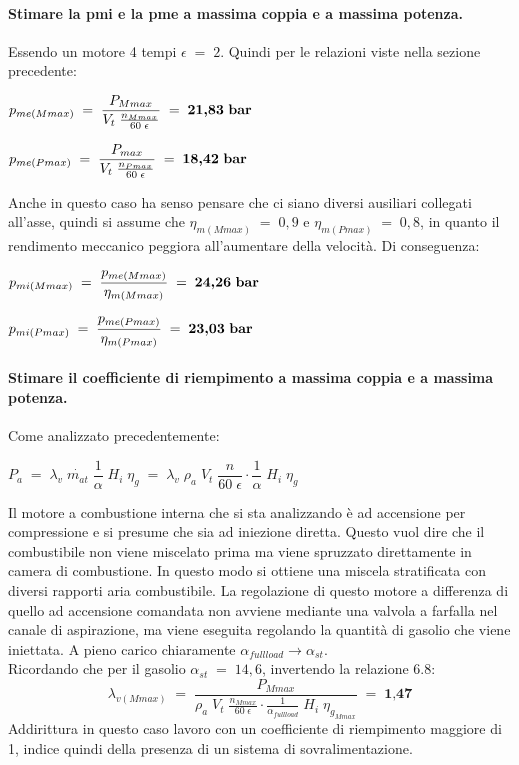 \documentclass[a4paper, twoside, 12pt]{report}
\begin{document}
\paragraph{Stimare la pmi e la pme a massima coppia e a massima potenza.\\}
Essendo un motore 4 tempi $\epsilon\;=\;2$. Quindi per le relazioni viste nella sezione precedente:
\begin{center}
	$p_{me(Mmax)}\;=\;\dfrac{P_{Mmax}}{V_{t}\;\frac{n_{Mmax}}{60\;\epsilon}}\;=\;\textbf{21,83\;bar}$
\end{center}
\begin{center}
	$p_{me(Pmax)}\;=\;\dfrac{P_{max}}{V_{t}\;\frac{n_{Pmax}}{60\;\epsilon}}\;=\;\textbf{18,42\;bar}$
\end{center}
Anche in questo caso ha senso pensare che ci siano diversi ausiliari collegati all'asse, quindi si assume che $\eta_{m(Mmax)}\;=\;0,9$ e $\eta_{m(Pmax)}\;=\;0,8$, in quanto il rendimento meccanico peggiora all'aumentare della velocità. Di conseguenza:
\begin{center}
	$p_{mi(Mmax)}\;=\;\dfrac{p_{me(Mmax)}}{\eta_{m(Mmax)}}\;=\;\textbf{24,26\;bar}$
\end{center}
\begin{center}
	$p_{mi(Pmax)}\;=\;\dfrac{p_{me(Pmax)}}{\eta_{m(Pmax)}}\;=\;\textbf{23,03\;bar}$
\end{center}
\paragraph{Stimare il coefficiente di riempimento a massima coppia e a massima potenza.\\}
Come analizzato precedentemente:
\begin{center}
	$P_{a}\;=\;\lambda_{v}\;\dot{m_{at}}\;\dfrac{1}{\alpha}\;H_{i}\;\eta_{g}\;=\;\lambda_{v}\;\rho_{a}\;V_{t}\;\dfrac{n}{60\;\epsilon}\cdot\dfrac{1}{\alpha}\;H_{i}\;\eta_{g}$
\end{center}
Il motore a combustione interna che si sta analizzando è ad accensione per compressione e si presume che sia ad iniezione diretta. Questo vuol dire che il combustibile non viene miscelato prima ma viene spruzzato direttamente in camera di combustione. In questo modo si ottiene una miscela stratificata con diversi rapporti aria combustibile. La regolazione di questo motore a differenza di quello ad accensione comandata non avviene mediante una valvola a farfalla nel canale di aspirazione, ma viene eseguita regolando la quantità di gasolio che viene iniettata. A pieno carico chiaramente $\alpha_{full load} \to \alpha_{st}$.\\
Ricordando che per il gasolio $\alpha_{st}\;=\;14,6$, invertendo la relazione 6.8:
\begin{equation}
	\lambda_{v(Mmax)}\;=\;\dfrac{P_{Mmax}}{\rho_{a}\;V_{t}\;\frac{n_{Mmax}}{60\;\epsilon}\cdot\frac{1}{\alpha_{full load}}\;H_{i}\;\eta_{g_{Mmax}}}\;=\;\textbf{1,47}
\end{equation}
Addirittura in questo caso lavoro con un coefficiente di riempimento maggiore di 1, indice quindi della presenza di un sistema di sovralimentazione.
\end{document}

